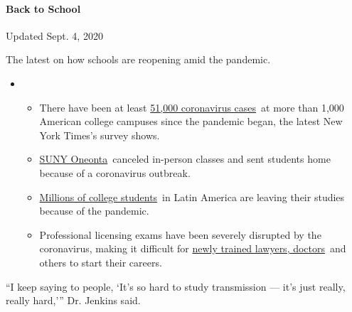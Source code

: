 \hypertarget{back-to-school}{%
\paragraph{Back to School}\label{back-to-school}}

Updated Sept. 4, 2020

The latest on how schools are reopening amid the pandemic.

\begin{itemize}
\item
  \begin{itemize}
  \tightlist
  \item
    There have been at least
    \href{https://www.nytimes3xbfgragh.onion/interactive/2020/us/covid-college-cases-tracker.html?name=styln-coronavirus-schools-reopening\&action=click\&pgtype=Article\&state=default\&region=MAIN_CONTENT_3\&context=storylines_keepup\&region=TOP_BANNER█=storyline_menu_recirc\&action=click\&pgtype=Article\&impression_id=149dfe80-eea3-11ea-aea8-57f827c5e458\&variant=1_Show}{51,000
    coronavirus cases}~at more than 1,000 American college campuses
    since the pandemic began, the latest New York Times's survey shows.
  \item
    \href{https://www.nytimes3xbfgragh.onion/2020/09/03/nyregion/new-york-suny-oneonta-coronavirus.html?action=click\&pgtype=Article\&state=default\&region=MAIN_CONTENT_3\&context=storylines_keepup}{SUNY
    Oneonta}~canceled in-person classes and sent students home because
    of a coronavirus outbreak.
  \item
    \href{https://www.nytimes3xbfgragh.onion/2020/09/04/world/americas/latin-america-education.html?\&action=click\&pgtype=Article\&state=default\&region=MAIN_CONTENT_3\&context=storylines_keepup}{Millions
    of college students}~in Latin America are leaving their studies
    because of the pandemic.
  \item
    Professional licensing exams have been severely disrupted by the
    coronavirus, making it difficult for
    \href{https://www.nytimes3xbfgragh.onion/2020/09/04/us/bar-exam-coronavirus.html?action=click\&pgtype=Article\&state=default\&region=MAIN_CONTENT_3\&context=storylines_keepup}{newly
    trained lawyers, doctors}~and others to start their careers.
  \end{itemize}
\end{itemize}

``I keep saying to people, `It's so hard to study transmission --- it's
just really, really hard,''' Dr. Jenkins said.

